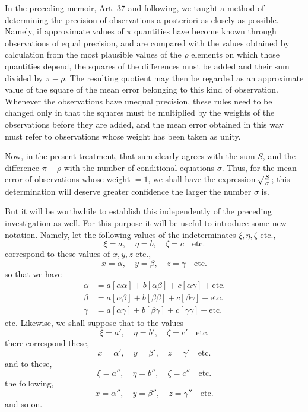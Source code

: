In the preceding memoir, Art. 37 and following, we taught a method of determining the precision of observations a posteriori as closely as possible. Namely, if approximate values of \(\pi\) quantities have become known through observations of equal precision, and are compared with the values obtained by calculation from the most plausible values of the \(\rho\) elements on which those quantities depend, the squares of the differences must be added and their sum divided by \(\pi-\rho\). The resulting quotient may then be regarded as an approximate value of the square of the mean error belonging to this kind of observation. Whenever the observations have unequal precision, these rules need to be changed only in that the squares must be multiplied by the weights of the observations before they are added, and the mean error obtained in this way must refer to observations whose weight has been taken as unity.

Now, in the present treatment, that sum clearly agrees with the sum \(S\), and the difference \(\pi-\rho\) with the number of conditional equations \(\sigma\). Thus, for the mean error of observations whose weight \(=1\), we shall have the expression \(\mathord{{}^{}\!\surd}\frac S\sigma\); this determination will deserve greater confidence the larger the number \(\sigma\) is.

But it will be worthwhile to establish this independently of the preceding investigation as well. For this purpose it will be useful to introduce some new notation. Namely, let the following values of the indeterminates \(\xi,\eta,\zeta\) etc.,
\[
\xi=a,\quad\eta=b,\quad\zeta=c\quad\text{etc.}
\]
correspond to these values of \(x,y,z\) etc.,
\[
x=\alpha,\quad y=\beta,\quad z=\gamma\quad\text{etc.}
\]
so that we have
\[
\begin{aligned}
\alpha&=a[\alpha\alpha]+b[\alpha\beta]+c[\alpha\gamma]+\text{etc.}\\
\beta&=a[\alpha\beta]+b[\beta\beta]+c[\beta\gamma]+\text{etc.}\\
\gamma&=a[\alpha\gamma]+b[\beta\gamma]+c[\gamma\gamma]+\text{etc.}
\end{aligned}
\]
etc. Likewise, we shall suppose that to the values
\[
\xi=a',\quad\eta=b',\quad\zeta=c'\quad\text{etc.}
\]
there correspond these,
\[
x=\alpha',\quad y=\beta',\quad z=\gamma'\quad\text{etc.}
\]
and to these,
\[
\xi=a'',\quad\eta=b'',\quad\zeta=c''\quad\text{etc.}
\]
the following,
\[
x=\alpha'',\quad y=\beta'',\quad z=\gamma''\quad\text{etc.}
\]
and so on.

